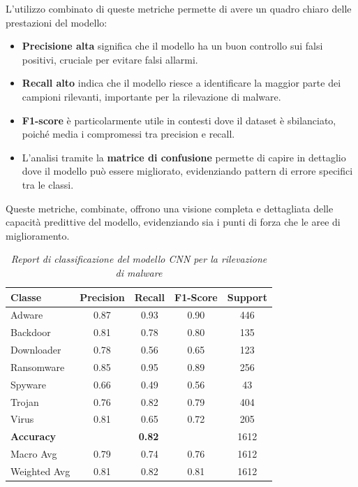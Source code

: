 L'utilizzo combinato di queste metriche permette di avere un quadro chiaro delle prestazioni del modello:
\begin{itemize}
    \item \textbf{Precisione alta} significa che il modello ha un buon controllo sui falsi positivi, cruciale per evitare falsi allarmi.
    \item \textbf{Recall alto} indica che il modello riesce a identificare la maggior parte dei campioni rilevanti, importante per la rilevazione di malware.
    \item \textbf{F1-score} è particolarmente utile in contesti dove il dataset è sbilanciato, poiché media i compromessi tra precision e recall.
    \item L'analisi tramite la \textbf{matrice di confusione} permette di capire in dettaglio dove il modello può essere migliorato, evidenziando pattern di errore specifici tra le classi.
\end{itemize}
Queste metriche, combinate, offrono una visione completa e dettagliata delle capacità predittive del modello, evidenziando sia i punti di forza che le aree di miglioramento.


\begin{table}[ht]
\centering
\begin{tabular}{@{}|lcccc|@{}}
\toprule
\textbf{Classe}      & \textbf{Precision} & \textbf{Recall} & \textbf{F1-Score} & \textbf{Support} \\ \midrule
Adware          & 0.87               & 0.93            & 0.90              & 446              \\
Backdoor        & 0.81               & 0.78            & 0.80              & 135              \\
Downloader      & 0.78               & 0.56            & 0.65              & 123              \\
Ransomware      & 0.85               & 0.95            & 0.89              & 256              \\
Spyware         & 0.66               & 0.49            & 0.56              & 43               \\
Trojan          & 0.76               & 0.82            & 0.79              & 404              \\
Virus           & 0.81               & 0.65            & 0.72              & 205              \\ \midrule
\textbf{Accuracy}      & \multicolumn{3}{c}{\textbf{0.82}}         & 1612             \\ \midrule
Macro Avg       & 0.79               & 0.74            & 0.76              & 1612             \\
Weighted Avg    & 0.81               & 0.82            & 0.81              & 1612             \\ \bottomrule
\end{tabular}
\vspace{.2cm}
\caption{\emph{Report di classificazione del modello CNN per la rilevazione di malware}}
\label{tab:classification_report}
\end{table}

